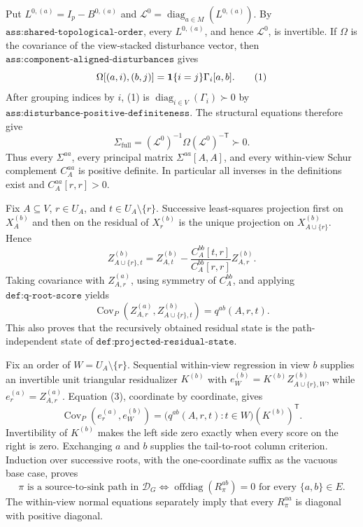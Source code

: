 Put \(L^{0,(a)}=I_p-B^{0,(a)}\) and \(\mathcal L^0=\operatorname{diag}_{a\in M}(L^{0,(a)})\).  By \(\texttt{ass:shared-topological-order}\), every \(L^{0,(a)}\), and hence \(\mathcal L^0\), is invertible.  If \(\Omega\) is the covariance of the view-stacked disturbance vector, then \(\texttt{ass:component-aligned-disturbances}\) gives
\[
 \Omega[(a,i),(b,j)]={\bf1}\{i=j\}\Gamma_i[a,b].
 \tag{1}
\]
After grouping indices by \(i\), (1) is \(\operatorname{diag}_{i\in V}(\Gamma_i)\succ0\) by \(\texttt{ass:disturbance-positive-definiteness}\).  The structural equations therefore give
\[
 \Sigma_{\mathrm{full}}
 = (\mathcal L^0)^{-1}\Omega(\mathcal L^0)^{-\mathsf T}\succ0.
 \tag{2}
\]
Thus every \(\Sigma^{aa}\), every principal matrix \(\Sigma^{aa}[A,A]\), and every within-view Schur complement \(C_A^{aa}\) is positive definite.  In particular all inverses in the definitions exist and \(C_A^{aa}[r,r]>0\).

Fix \(A\subseteq V\), \(r\in U_A\), and \(t\in U_A\setminus\{r\}\).  Successive least-squares projection first on \(X_A^{(b)}\) and then on the residual of \(X_r^{(b)}\) is the unique projection on \(X_{A\cup\{r\}}^{(b)}\).  Hence
\[
 Z_{A\cup\{r\},t}^{(b)}
 =Z_{A,t}^{(b)}-
 \frac{C_A^{bb}[t,r]}{C_A^{bb}[r,r]}Z_{A,r}^{(b)}.
\]
Taking covariance with \(Z_{A,r}^{(a)}\), using symmetry of \(C_A^{bb}\), and applying \(\texttt{def:q-root-score}\) yields
\[
 \operatorname{Cov}_P(Z_{A,r}^{(a)},Z_{A\cup\{r\},t}^{(b)})
 =q^{ab}(A,r,t).
 \tag{3}
\]
This also proves that the recursively obtained residual state is the path-independent state of \(\texttt{def:projected-residual-state}\).

Fix an order of \(W=U_A\setminus\{r\}\).  Sequential within-view regression in view \(b\) supplies an invertible unit triangular residualizer \(K^{(b)}\) with \(e_W^{(b)}=K^{(b)}Z_{A\cup\{r\},W}^{(b)}\), while \(e_r^{(a)}=Z_{A,r}^{(a)}\).  Equation (3), coordinate by coordinate, gives
\[
 \operatorname{Cov}_P(e_r^{(a)},e_W^{(b)})
 =\bigl(q^{ab}(A,r,t):t\in W\bigr)(K^{(b)})^{\mathsf T}.
 \tag{4}
\]
Invertibility of \(K^{(b)}\) makes the left side zero exactly when every score on the right is zero.  Exchanging \(a\) and \(b\) supplies the tail-to-root column criterion.  Induction over successive roots, with the one-coordinate suffix as the vacuous base case, proves
\[
 \pi\text{ is a source-to-sink path in }\mathcal D_G
 \Longleftrightarrow
 \operatorname{offdiag}(R_\pi^{ab})=0
 \text{ for every }\{a,b\}\in E.
 \tag{5}
\]
The within-view normal equations separately imply that every \(R_\pi^{aa}\) is diagonal with positive diagonal.

